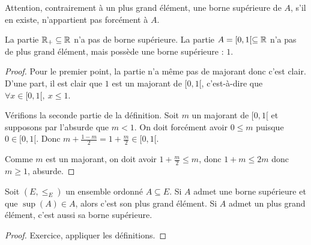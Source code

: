 Attention, contrairement à un plus grand élément, une  borne supérieure de $A$, s'il en existe, n'appartient pas forcément à $A$. 
\begin{exemple}
La partie $\mathbb{R}_+ \subseteq \mathbb{R}$ n'a pas de borne supérieure. 
La partie $A=[0,1[ \subseteq \mathbb{R}$ n'a pas de plus grand élément, mais possède une borne supérieure : $1$.
\end{exemple}
\begin{proof} Pour le premier point, la partie n'a même pas de majorant donc c'est clair. 
D'une part, il est clair que $1$ est un majorant de $[0,1[$, c'est-à-dire que $\forall x\in [0,1[, \: x\leq 1$.

Vérifions la seconde partie de la définition.  Soit $m$ un majorant de $[0,1[$ et supposons par l'absurde que $m < 1$. On doit forcément avoir $0\leq m$ puisque $0\in [0,1[$. Donc $m+\frac{1-m}{2}=1+\frac{m}{2} \in [0,1[$.
\begin{center}
\end{center}

 Comme $m$ est un majorant, on doit avoir $1+\frac{m}{2}\leq m$, donc $1+m\leq 2m$ donc $m\geq 1$, absurde.
\end{proof}

\begin{proposition}
Soit $(E,\leq_E)$ un ensemble ordonné $A\subseteq E$.
Si $A$ admet une borne supérieure et que $\sup(A) \in A$, alors c'est son plus grand élément.
Si $A$ admet un plus grand élément, c'est aussi sa borne supérieure.
\end{proposition}
\begin{proof}
Exercice, appliquer les définitions.
\end{proof}


